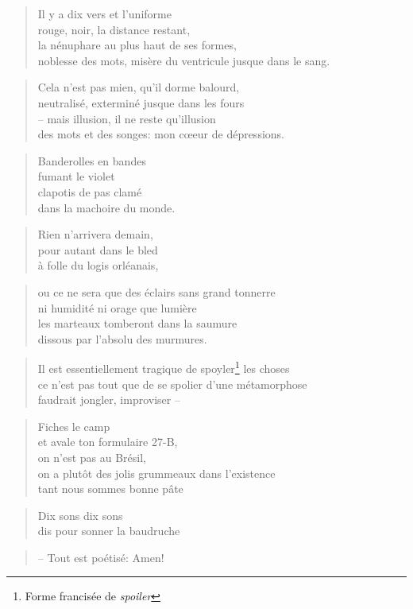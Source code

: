   \begin{verse}
    Il y a dix vers et l’uniforme\\
    rouge, noir, la distance restant,\\
    la nénuphare au plus haut de ses formes,\\
    noblesse des mots, misère du ventricule jusque dans le sang.
  \end{verse}
  \begin{verse}
    Cela n’est pas mien, qu’il dorme balourd,\\
    neutralisé, exterminé jusque dans les fours\\
    -- mais illusion, il ne reste qu’illusion\\
    des mots et des songes: mon cœeur de dépressions.
  \end{verse}
  \begin{verse}
    Banderolles en bandes\\
    fumant le violet\\
    clapotis de pas clamé\\
    dans la machoire du monde.
  \end{verse}
  \begin{verse}
    Rien n’arrivera demain,\\
    pour autant dans le bled\\
    à folle du logis orléanais,
  \end{verse}
  \begin{verse}
    ou ce ne sera que des éclairs sans grand tonnerre\\
    ni humidité ni orage que lumière\\
    les marteaux tomberont dans la saumure\\
    dissous par l’absolu des murmures.
  \end{verse}
  \begin{verse}
    Il est essentiellement tragique de spoyler\footnote{Forme francisée de \emph{spoiler}} les choses\\
    ce n’est pas tout que de se spolier d’une métamorphose\\
    faudrait jongler, improviser --
  \end{verse}
  \begin{center}
  \end{center}
  \begin{verse}
    Fiches le camp\\
    et avale ton formulaire 27-B,\\
    on n’est pas au Brésil,\\
    on a plutôt des jolis grummeaux dans l’existence\\
    tant nous sommes bonne pâte
  \end{verse}
  \begin{verse}
    Dix sons dix sons\\
    dis pour sonner la baudruche
  \end{verse}
  \begin{verse}
    -- Tout est poétisé: Amen!
  \end{verse}
